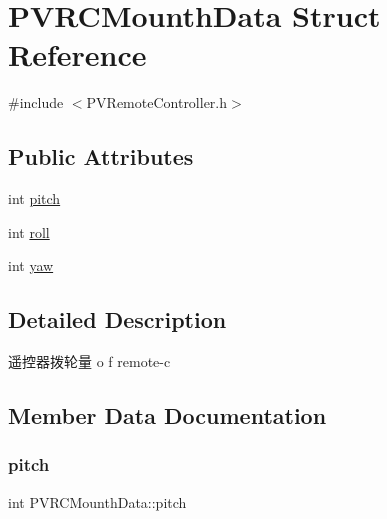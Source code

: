 \hypertarget{struct_p_v_r_c_mounth_data}{}\section{P\+V\+R\+C\+Mounth\+Data Struct Reference}
\label{struct_p_v_r_c_mounth_data}


{\ttfamily \#include $<$P\+V\+Remote\+Controller.\+h$>$}

\subsection*{Public Attributes}
\begin{DoxyCompactItemize}
\item 
int \hyperlink{struct_p_v_r_c_mounth_data_a1dd19f58b15bb25bfefb389de16d8781}{pitch}
\item 
int \hyperlink{struct_p_v_r_c_mounth_data_aa6ba5928e2d220c29bf72a58c84c3e64}{roll}
\item 
int \hyperlink{struct_p_v_r_c_mounth_data_a87b7fafb05530ea3f927a942bce03ed3}{yaw}
\end{DoxyCompactItemize}


\subsection{Detailed Description}
遥控器拨轮量 o f remote-\/c 

\subsection{Member Data Documentation}
\mbox{\label{struct_p_v_r_c_mounth_data_a1dd19f58b15bb25bfefb389de16d8781}} 
\subsubsection{\texorpdfstring{pitch}{pitch}}
{\footnotesize\ttfamily int P\+V\+R\+C\+Mounth\+Data\+::pitch}

\mbox{\label{struct_p_v_r_c_mounth_data_aa6ba5928e2d220c29bf72a58c84c3e64}} 
